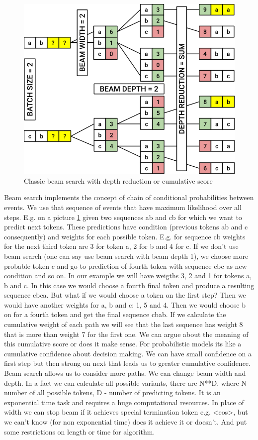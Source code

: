 \documentclass{article}
\begin{document}
\begin{figure}[H]
    \centering
    \includegraphics[width=1.0\linewidth]{beam_frw.png}
    \caption{Classic beam search with depth reduction or cumulative score}
    \label{fig:beam_fwd}
\end{figure}
Beam search implements the concept of chain of conditional probabilities between events. We use that sequence of events that have maximum likelihood over all steps. E.g. on a picture \ref{fig:beam_fwd} given two sequences ab and cb for which we want to predict next tokens. These predictions have condition (previous tokens ab and c consequently) and weights for each possible token. E.g. for sequence cb weights for the next third token are 3 for token a, 2 for b and 4 for c. If we don't use beam search (one can say use beam search with beam depth 1), we choose more probable token c and go to prediction of fourth token with sequence cbc as new condition and so on. In our example we will have weigths 3, 2 and 1 for tokens a, b and c. In this case we would choose a fourth final token and produce a resulting sequence cbca.
But what if we would choose a token on the first step? Then we would have another weights for a, b and c: 1, 5 and 4. Then we would choose b on for a fourth token and get the final sequence cbab.
If we calculate the cumulative weight of each path we will see that the last sequence has weight 8 that is more than weight 7 for the first one. We can argue about the meaning of this cumulative score or does it make sense. For probabilistic models its like a cumulative confidence about decision making. We can have small confidence on a first step but then strong on next that leads us to greater cumulative confidence.
Beam search allows us to consider more paths. We can change beam width and depth. In a fact we can calculate all possible variants, there are N**D, where N - number of all possible tokens, D - number of predicting tokens. It is an exponential time task and requires a huge computational resources. In place of width we can stop beam if it achieves special termination  token e.g. <eos>, but we can't know (for non exponential time) does it achieve it or doesn’t. And put some restrictions on length or time for algorithm.
\end{document}
